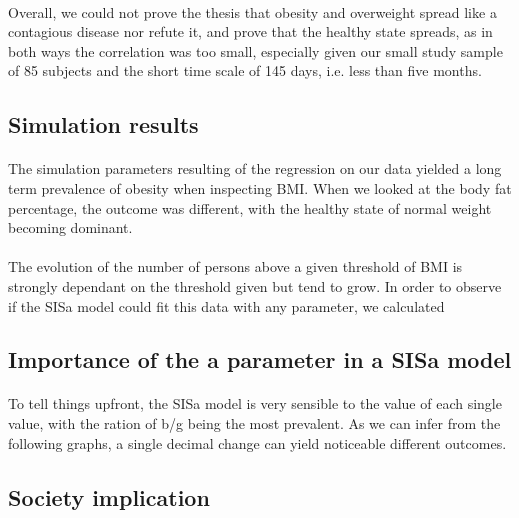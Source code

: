 \documentclass[11pt]{article}
\begin{document}
\paragraph{}

Overall, we could not prove the thesis that obesity and overweight spread like a contagious disease nor refute it, and prove that the healthy state spreads, as in both ways the correlation was too small, especially given our small study sample of 85 subjects and the short time scale of 145 days, i.e. less than five months.

\subsection{Simulation results}
\paragraph{}
The simulation parameters resulting of the regression on our data yielded a long term prevalence of obesity when inspecting BMI. When we looked at the body fat percentage, the outcome was different, with the healthy state of normal weight becoming dominant.


\paragraph{}
The evolution of the number of persons above a given threshold of BMI is strongly dependant on the threshold given but tend to grow. In order to observe if the SISa model could fit this data with any parameter, we calculated %


\subsection{Importance of the a parameter in a SISa model}
\paragraph{}
To tell things upfront, the SISa model is very sensible to the value of each single value, with the ration of b/g being the most prevalent. As we can infer from the following graphs, a single decimal change can yield noticeable different outcomes.



\subsection{Society implication}
\end{document}
